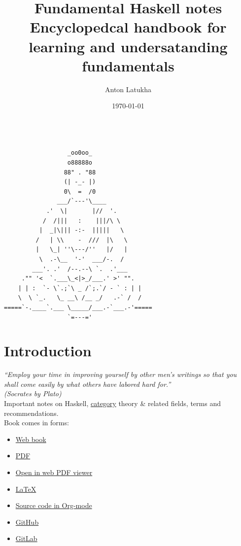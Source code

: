 \documentclass[a4paper,14pt,oneside]{book}
\author{Anton Latukha}
\date{\today}
\title{Fundamental Haskell notes\\\medskip
\large Encyclopedcal handbook for learning and undersatanding fundamentals}
\begin{document}
\maketitle
\setcounter{tocdepth}{10}
\tableofcontents

\begin{verbatim}

                  _oo0oo_
                  o88888o
                 88" . "88
                 (| -_- |)
                 0\  =  /0
               ___/`---'\____
            .'  \|       |//  '.
           /  /|||   :    |||/\ \
          |  _|\||| -:-  |||||   \
         /   | \\    -  ///  |\   \
         |   \_| ''\---/''   |/   |
          \  .-\__  '-'  ___/-.  /
        ___'. .'  /--.--\ `.  .'___
     ."" '<  `.___\_<|>_/___.' >' "".
    | | :  `- \`.;`\ _ /`;.`/ - ` : | |
    \  \ `_.   \_ __\ /__ _/   .-` /  /
=====`-.____`.___ \_____/___.-`___.-'=====
                  `=---='

\end{verbatim}



\part{Introduction}
\label{sec:orgd05c443}

\emph{“Employ your time in improving yourself by other men's writings so that you shall come easily by what others have labored hard for.”\\
(Socrates by Plato)}\\

Important notes on Haskell, \hyperref[org25abeff]{category} theory \& related fields, terms and recommendations.\\

Book comes in forms:\\
\begin{itemize}
\item \href{https://blog.latukha.com/haskell-notes}{Web book}\\
\item \href{https://github.com/Anton-Latukha/haskell-notes/raw/master/README.pdf}{PDF}\\
\item \href{https://github.com/Anton-Latukha/haskell-notes/blob/master/README.pdf}{Open in web PDF viewer}\\
\item \href{https://github.com/Anton-Latukha/haskell-notes/raw/master/README.tex}{\LaTeX{}}\\
\item \href{https://github.com/Anton-Latukha/haskell-notes/raw/master/README.org}{Source code in Org-mode}\\
\item \href{https://github.com/Anton-Latukha/haskell-notes}{GitHub}\\
\item \href{https://gitlab.com/Anton.Latukha/haskell-notes}{GitLab}\\
\end{itemize}
\end{document}
